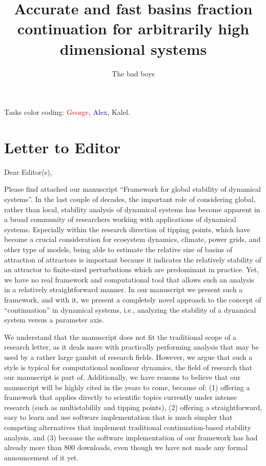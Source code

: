 \documentclass{article}
\title{Accurate and fast basins fraction continuation for arbitrarily high dimensional systems}
\author{The bad boys}
\newcommand{\george}[1]{\textcolor{red}{#1}}
\newcommand{\alex}[1]{\textcolor{blue}{#1}}
\newcommand{\kalel}[1]{\textcolor{OliveGreen}{#1}}
\begin{document}
\maketitle

Tasks color coding: \george{George}, \alex{Alex}, \kalel{Kalel}.

\tableofcontents

\section{Letter to Editor}
Dear Editor(s),

Please find attached our manuscript ``Framework for global stability of dynamical systems''. In the last couple of decades, the important role of considering global, rather than local, stability analysis of dynamical systems has become apparent in a broad community of researchers working with applications of dynamical systems. Especially within the research direction of tipping points, which have become a crucial consideration for ecosystem dynamics, climate, power grids, and other type of models, being able to estimate the relative size of basins of attraction of attractors is important because it indicates the relatively stability of an attractor to finite-sized perturbations which are predominant in practice. Yet, we have no real framework and computational tool that allows such an analysis in a relatively straightforward manner. In our manuscript we present such a framework, and with it, we present a completely novel approach to the concept of ``continuation'' in dynamical systems, i.e., analyzing the stability of a dynamical system versus a parameter axis.

We understand that the manuscript does not fit the traditional scope of a research letter, as it deals more with practically performing analysis that may be used by a rather large gambit of research fields. However, we argue that such a style is typical for computational nonlinear dynamics, the field of research that our manuscript is part of. Additionally, we have reasons to believe that our manuscript will be highly cited in the years to come, because of: (1) offering a framework that applies directly to scientific topics currently under intense research (such as multistabilily and tipping points), (2) offering a straightforward, easy to learn and use software implementation that is much simpler that competing alternatives that implement traditional continuation-based stability analysis, and (3) because the software implementation of our framework has had already more than 800 downloads, even though we have not made any formal announcement of it yet.
\end{document}
